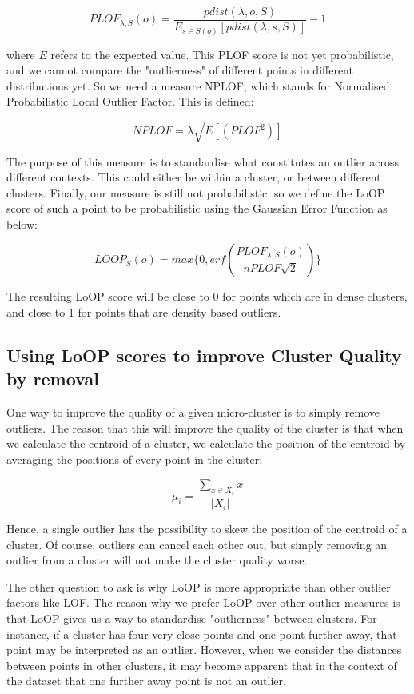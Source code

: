 \documentclass[12pt,a4paper,oneside]{report}
\begin{document}
\[PLOF_{\lambda,S}(o) = \frac{pdist(\lambda,o,S)}{E_{s \in S(o)}[pdist(\lambda, s, S)]} - 1\]

where $E$ refers to the expected value.  This PLOF score is not yet probabilistic, and we cannot compare the "outlierness" of different points in different distributions yet. So we need a measure NPLOF, which stands for Normalised Probabilistic Local Outlier Factor. This is defined:

\[NPLOF = \lambda \sqrt{E[(PLOF^2)]}\]

The purpose of this measure is to standardise what constitutes an outlier across different contexts. This could either be within a cluster, or between different clusters. Finally, our measure is still not probabilistic, so we define the LoOP score of such a point to be probabilistic using the Gaussian Error Function as below:

\[LOOP_S(o) = max \{0, erf(\frac{PLOF_{\lambda,S}(o)}{nPLOF\sqrt{2}})\}\]

The resulting LoOP score will be close to 0 for points which are in dense clusters, and close to 1 for points that are density based outliers. 

\subsection{Using LoOP scores to improve Cluster Quality by removal}

One way to improve the quality of a given micro-cluster is to simply remove outliers. The reason that this will improve the quality of the cluster is that when we calculate the centroid of a cluster, we calculate the position of the centroid by averaging the positions of every point in the cluster:

\[\mu_i = \frac{\sum_{x \in X_i}x}{|X_i|}\]

Hence, a single outlier has the possibility to skew the position of the centroid of a cluster. Of course, outliers can cancel each other out, but simply removing an outlier from a cluster will not make the cluster quality worse. 

The other question to ask is why LoOP is more appropriate than other outlier factors like LOF. The reason why we prefer LoOP over other outlier measures is that LoOP gives us a way to standardise "outlierness" between clusters. For instance, if a cluster has four very close points and one point further away, that point may be interpreted as an outlier. However, when we consider the distances between points in other clusters, it may become apparent that in the context of the dataset that one further away point is not an outlier. 
\end{document}
